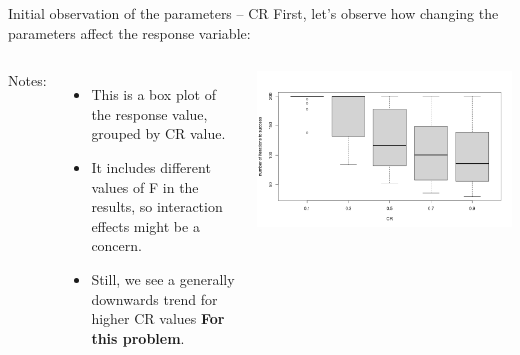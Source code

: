 \begin{frame}[t]{Initial observation of the parameters -- CR}{}
  First, let's observe how changing the parameters affect the response variable:
  \begin{columns}
    Notes:
    \begin{itemize}
    \item This is a box plot of the response value, grouped by CR value.
    \item It includes different values of F in the results, so
      interaction effects might be a concern.
    \item Still, we see a generally downwards trend for higher CR values {\bf For this problem}.
    \end{itemize}
    \includegraphics[width=\textwidth]{../img/DE_experiment_CR_analysis.png}
  \end{columns}
\end{frame}

